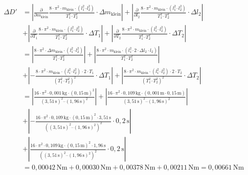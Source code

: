 \documentclass[fontsize=12pt]{scrartcl}
\begin{document}
\begin{align*}
\Delta D'&=\left \vert \frac{\partial}{\partial m_{\text{klein}}} \frac{8 \cdot \pi^2 \cdot m_{\text{klein}} \cdot (l_1^2 – l_2^2)}{T_1^2 – T_2^2} \cdot 
\Delta m_{\text{klein}} \right \vert 
+\left \vert \frac{\partial}{\partial l_2} \frac{8 \cdot \pi^2 \cdot m_{\text{klein}} \cdot (l_1^2 – l_2^2)}{T_1^2 – T_2^2}
\cdot \Delta l_2 \right \vert \\
&+ \left \vert\frac{\partial}{\partial T_1}\frac{8 \cdot \pi^2 \cdot m_{\text{klein}} \cdot (l_1^2 – l_2^2)}{T_1^2 – T_2^2} \cdot 
\Delta T_1 \right \vert
+ \left \vert\frac{\partial}{\partial T_2}\frac{8 \cdot \pi^2 \cdot m_{\text{klein}} \cdot (l_1^2 – l_2^2)}{T_1^2 – T_2^2} \cdot 
\Delta T_2 \right \vert\\
%
&=\left \vert  \frac{8 \cdot \pi^2 \cdot \Delta m_{\text{klein}} \cdot (l_1^2 – l_2^2)}{T_1^2 – T_2^2} \right \vert 
+\left \vert \frac{8 \cdot \pi^2 \cdot m_{\text{klein}} \cdot (l_1^2 – 2\cdot\Delta l_2\cdot l_2  )}{T_1^2 – T_2^2}  \right \vert \\
&+ \left \vert- \frac{8 \cdot \pi^2 \cdot m_{\text{klein}} \cdot (l_1^2 – l_2^2)\cdot 2\cdot T_1}{(T_1^2 – T_2^2)^2} \cdot 
\Delta T_1 \right \vert
+\left \vert \frac{8 \cdot \pi^2 \cdot m_{\text{klein}} \cdot (l_1^2 – l_2^2)\cdot 2\cdot T_2}{(T_1^2 – T_2^2)^2} \cdot 
\Delta T_2 \right \vert \\
%
&=\left \vert  \frac{16 \cdot \pi^2 \cdot 0,001\,\text{kg} \cdot (0,15\,\text{m})^2}{(3,51\,\text{s})^2 – (1,96\,\text{s})^2} \right \vert 
+\left \vert \frac{16 \cdot \pi^2 \cdot 0,109\,\text{kg} \cdot (0,001\,\text{m} \cdot 0,15\,\text{m})}{(3,51\,\text{s})^2 – (1,96\,\text{s})^2}  \right \vert \\
&+ \left \vert- \frac{16 \cdot \pi^2 \cdot 0,109\,\text{kg} \cdot(0,15\,\text{m})^2\cdot 3,51\,\text{s}}{((3,51\,\text{s})^2 – (1,96\,\text{s})^2)^2} \cdot 
0,2\,\text{s} \right \vert\\
&+\left \vert \frac{16 \cdot \pi^2 \cdot 0,109\,\text{kg} \cdot (0,15\,\text{m})^2\cdot 1,96\,\text{s}}{((3,51\,\text{s})^2 – (1,96\,\text{s})^2)^2} \cdot 
0,2\,\text{s} \right \vert \\
%
&=0,00042\,\text{Nm}+ 0,00030\,\text{Nm} + 0,00378\,\text{Nm} +0,00211\,\text{Nm} =   0,00661\,\text{Nm}
	\end{align*}
\end{document}
